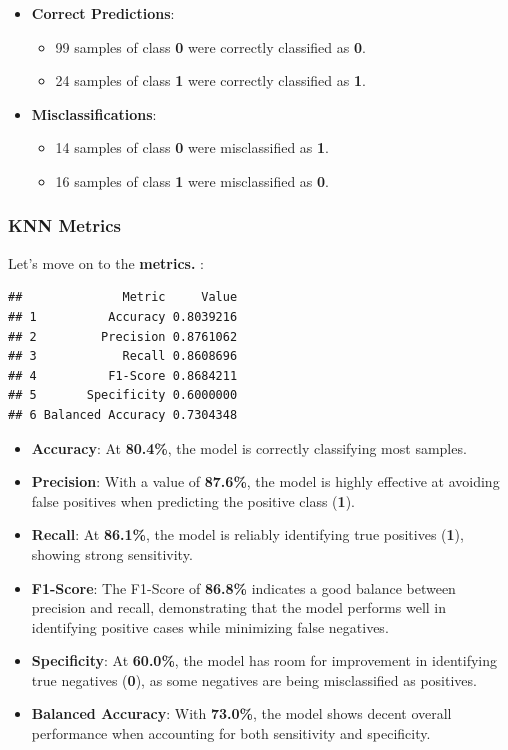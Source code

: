 \documentclass[
]{article}
\providecommand{\tightlist}{%
  \setlength{\itemsep}{0pt}\setlength{\parskip}{0pt}}
\begin{document}
\begin{itemize}
\tightlist
\item
  \textbf{Correct Predictions}:

  \begin{itemize}
  \tightlist
  \item
    99 samples of class \textbf{0} were correctly classified as
    \textbf{0}.
  \item
    24 samples of class \textbf{1} were correctly classified as
    \textbf{1}.
  \end{itemize}
\item
  \textbf{Misclassifications}:

  \begin{itemize}
  \tightlist
  \item
    14 samples of class \textbf{0} were misclassified as \textbf{1}.
  \item
    16 samples of class \textbf{1} were misclassified as \textbf{0}.
  \end{itemize}
\end{itemize}

\newpage

\subsubsection{KNN Metrics}\label{knn-metrics}

Let's move on to the \textbf{metrics.} :

\begin{verbatim}
##              Metric     Value
## 1          Accuracy 0.8039216
## 2         Precision 0.8761062
## 3            Recall 0.8608696
## 4          F1-Score 0.8684211
## 5       Specificity 0.6000000
## 6 Balanced Accuracy 0.7304348
\end{verbatim}

\begin{itemize}
\tightlist
\item
  \textbf{Accuracy}: At \textbf{80.4\%}, the model is correctly
  classifying most samples.
\item
  \textbf{Precision}: With a value of \textbf{87.6\%}, the model is
  highly effective at avoiding false positives when predicting the
  positive class (\textbf{1}).
\item
  \textbf{Recall}: At \textbf{86.1\%}, the model is reliably identifying
  true positives (\textbf{1}), showing strong sensitivity.
\item
  \textbf{F1-Score}: The F1-Score of \textbf{86.8\%} indicates a good
  balance between precision and recall, demonstrating that the model
  performs well in identifying positive cases while minimizing false
  negatives.
\item
  \textbf{Specificity}: At \textbf{60.0\%}, the model has room for
  improvement in identifying true negatives (\textbf{0}), as some
  negatives are being misclassified as positives.
\item
  \textbf{Balanced Accuracy}: With \textbf{73.0\%}, the model shows
  decent overall performance when accounting for both sensitivity and
  specificity.
\end{itemize}
\end{document}
